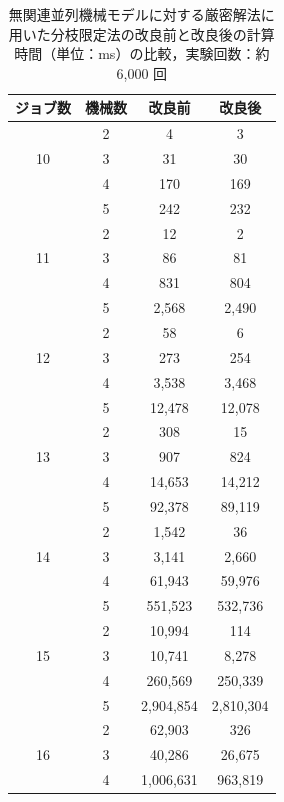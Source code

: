 \documentclass[12pt]{optlab-bachelor}
\begin{document}
\begin{table}[htb]
  \begin{center}
    \begin{tabular}{|c|c|c|c|} \hline
      ジョブ数 & 機械数 & 改良前 & 改良後 \\ \hline \hline
      & 2 & 4 & 3 \\ \cline{2-4}
      10 & 3 & 31 & 30  \\ \cline{2-4}
      & 4 & 170 & 169  \\ \cline{2-4}
      & 5 & 242 & 232 \\ \hline \hline
      & 2 & 12 & 2 \\ \cline{2-4}
      11 & 3 & 86 & 81 \\ \cline{2-4}
      & 4 & 831 & 804\\ \cline{2-4}
      & 5 & 2,568 & 2,490  \\ \hline \hline
      & 2 & 58 &  6 \\ \cline{2-4}
      12 & 3 & 273 & 254 \\ \cline{2-4}
      & 4 &  3,538 & 3,468 \\ \cline{2-4}
      & 5 & 12,478 &  12,078  \\ \hline \hline
      & 2 & 308 & 15 \\ \cline{2-4}
      13 & 3 & 907 & 824 \\ \cline{2-4}
      & 4 & 14,653 & 14,212 \\ \cline{2-4}
      & 5 & 92,378 & 89,119 \\ \hline \hline
      & 2 & 1,542 & 36 \\ \cline{2-4}
      14 & 3 & 3,141 & 2,660 \\ \cline{2-4}
      & 4 & 61,943 & 59,976 \\ \cline{2-4}
      & 5 & 551,523 & 532,736 \\ \hline \hline
      & 2 & 10,994 & 114 \\ \cline{2-4}
      15 & 3 & 10,741 & 8,278 \\ \cline{2-4}
      & 4 & 260,569 & 250,339 \\ \cline{2-4}
      & 5 & 2,904,854 & 2,810,304 \\ \hline \hline
      & 2 & 62,903 & 326 \\ \cline{2-4}
      16 & 3 & 40,286 & 26,675 \\ \cline{2-4}
      & 4 & 1,006,631 & 963,819 \\ \hline \hline

    \end{tabular}
    \caption{無関連並列機械モデルに対する厳密解法に用いた分枝限定法の改良前と改良後の計算時間（単位：ms）の比較，実験回数：約 6,000 回}
    \label{A4}
  \end{center}
\end{table}
\end{document}
